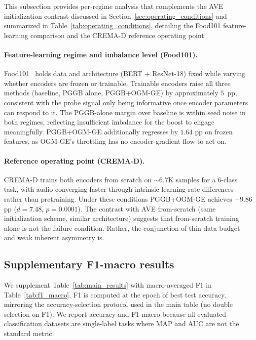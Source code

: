 \documentclass{article} %
\begin{document}
This subsection provides per-regime analysis that complements the AVE initialization contrast discussed in Section~\ref{sec:operating_conditions} and summarized in Table~\ref{tab:operating_conditions}, detailing the Food101 feature-learning comparison and the CREMA-D reference operating point.

\paragraph{Feature-learning regime and imbalance level (Food101).}
Food101~\citep{wang2015upmcfood} holds data and architecture (BERT + ResNet-18) fixed while varying whether encoders are frozen or trainable. Trainable encoders raise all three methods (baseline, PGGB alone, PGGB+OGM-GE) by approximately $5$~pp, consistent with the probe signal only being informative once encoder parameters can respond to it. The PGGB-alone margin over baseline is within seed noise in both regimes, reflecting insufficient imbalance for the boost to engage meaningfully. PGGB+OGM-GE additionally regresses by $1.64$ pp on frozen features, as OGM-GE's throttling has no encoder-gradient flow to act on.

\paragraph{Reference operating point (CREMA-D).}
CREMA-D trains both encoders from scratch on $\sim 6.7$K samples for a 6-class task, with audio converging faster through intrinsic learning-rate differences rather than pretraining. Under these conditions PGGB+OGM-GE achieves $+9.86$ pp ($d{=}7.48$, $p{=}0.0001$). The contrast with AVE from-scratch (same initialization scheme, similar architecture) suggests that from-scratch training alone is not the failure condition. Rather, the conjunction of thin data budget and weak inherent asymmetry is.

\subsection{Supplementary F1-macro results}
\label{app:f1}

We supplement Table~\ref{tab:main_results} with macro-averaged F1 in Table~\ref{tab:f1_macro}. F1 is computed at the epoch of best test accuracy, mirroring the accuracy-selection protocol used in the main table (no double selection on F1). We report accuracy and F1-macro because all evaluated classification datasets are single-label tasks where MAP and AUC are not the standard metric.
\end{document}
